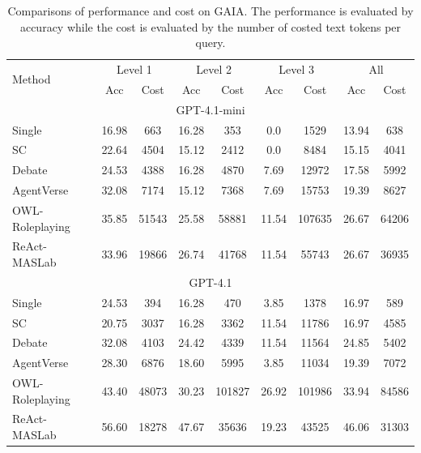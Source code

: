 \documentclass{article}
\begin{document}
\begin{table}[t]
    \centering
    \begin{tabular}{lcccccccc}
    \toprule
    \multirow{2}{*}{Method} & \multicolumn{2}{c}{Level 1} & \multicolumn{2}{c}{Level 2} & \multicolumn{2}{c}{Level 3} & \multicolumn{2}{c}{All} \\
    & Acc & Cost & Acc & Cost & Acc & Cost & Acc & Cost \\
    \midrule
    \multicolumn{9}{c}{GPT-4.1-mini}\\
    Single & 16.98 & 663 & 16.28 & 353 & 0.0 & 1529 & 13.94 & 638\\
    SC & 22.64 & 4504 & 15.12 & 2412 & 0.0 & 8484 & 15.15 & 4041\\
    Debate & 24.53 & 4388 & 16.28 & 4870 & 7.69 & 12972 & 17.58 & 5992\\
    AgentVerse & 32.08 & 7174 & 15.12 & 7368 & 7.69 & 15753 & 19.39 & 8627\\
    OWL-Roleplaying & 35.85 & 51543 & 25.58 & 58881 & 11.54 & 107635 & 26.67 & 64206\\
    ReAct-MASLab & 33.96 & 19866 & 26.74 & 41768 & 11.54 & 55743 & 26.67 & 36935\\
    \midrule
    \multicolumn{9}{c}{GPT-4.1}\\
    Single & 24.53 & 394 & 16.28 & 470 & 3.85 & 1378 & 16.97 & 589\\
    SC & 20.75 & 3037 & 16.28 & 3362 & 11.54 & 11786 & 16.97 & 4585\\
    Debate & 32.08 & 4103 & 24.42 & 4339 & 11.54 & 11564 & 24.85 & 5402\\
    AgentVerse & 28.30 & 6876 & 18.60 & 5995 & 3.85 & 11034 & 19.39 & 7072\\
    OWL-Roleplaying & 43.40 & 48073 & 30.23 & 101827 & 26.92 & 101986 & 33.94 & 84586\\
    ReAct-MASLab & 56.60 & 18278 & 47.67 & 35636 & 19.23 & 43525 & 46.06 & 31303\\

    \bottomrule
    \end{tabular}
    \caption{Comparisons of performance and cost on GAIA. The performance is evaluated by accuracy while the cost is evaluated by the number of costed text tokens per query.}
    \label{tab:gaia}
\end{table}
\end{document}
